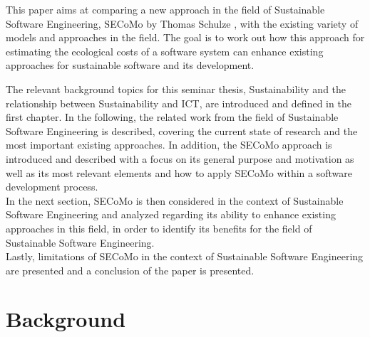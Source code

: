 \documentclass[oribibl]{llncs}
\begin{document}
This paper aims at comparing a new approach in the field of Sustainable Software Engineering, SECoMo by Thomas Schulze \cite{schulze_cost_2016}, with the existing variety of models and approaches in the field. The goal is to work out how this approach for estimating the ecological costs of a software system can enhance existing approaches for sustainable software and its development. %

The relevant background topics for this seminar thesis, Sustainability and the relationship between Sustainability and ICT,
are introduced and defined in the first chapter. In the following, the related work from the field of Sustainable Software Engineering is described, covering the current state of research and the most important existing approaches. %
In addition, the SECoMo approach is introduced %
and described with a focus on its general purpose and motivation as well as its most relevant elements and how to apply SECoMo within a software development process. %
\\ In the next section, SECoMo is then considered in the context of Sustainable Software Engineering and analyzed regarding its ability to enhance existing approaches in this field, in order to identify its benefits for the field of Sustainable Software Engineering.\\
Lastly, limitations of SECoMo in the context of Sustainable Software Engineering are presented and a conclusion of the paper is presented.

\section{Background}
\end{document}
